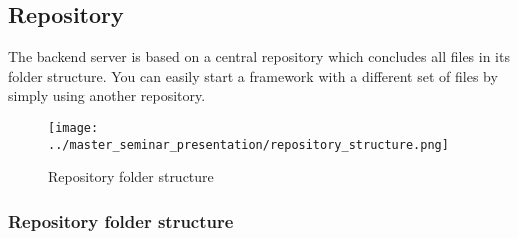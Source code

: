 	\subsection{Repository}\label{subsec_repository}
		The backend server is based on a central repository which concludes all files in its folder structure. You can easily start a framework with a different set of files by simply using another repository.
		
		\begin{figure}[hbtp]
		\caption{Repository folder structure}
		\centering
		\texttt{[image: ../master\_seminar\_presentation/repository\_structure.png]}
		\end{figure}
		

		\subsubsection{Repository folder structure}
